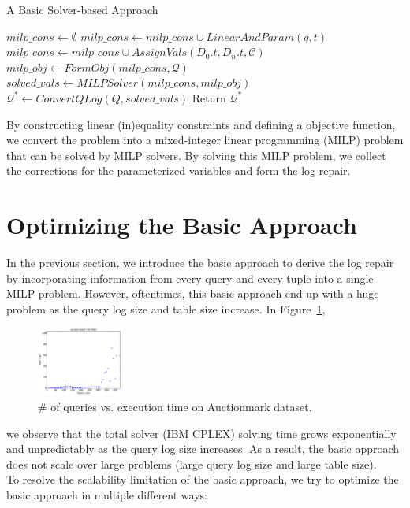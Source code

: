 \begin{algorithm}[htbp]
\caption{A Basic Solver-based Approach}
\label{alg:basic}
\begin{algorithmic}
\STATE $milp\_cons \leftarrow \emptyset$
\STATE $milp\_cons \leftarrow milp\_cons \cup LinearAndParam(q, t)$
\ENDFOR
\STATE $milp\_cons \leftarrow milp\_cons \cup AssignVals(D_0.t, D_n.t, \mathcal{C})$
\ENDFOR 
\STATE $milp\_obj \leftarrow FormObj (milp\_cons, \mathcal{Q})$
\STATE $solved\_vals \leftarrow MILPSolver(milp\_cons, milp\_obj)$
\STATE $\mathcal{Q}^* \leftarrow ConvertQLog(Q, solved\_vals)$
\STATE Return $\mathcal{Q}^*$
\end{algorithmic}
\end{algorithm}
By constructing linear (in)equality constraints and
defining a objective function, we convert the problem into
 a mixed-integer linear programming (MILP) problem that can be 
 solved by MILP solvers. By solving this MILP problem, we collect the
corrections for the parameterized variables and form the log repair. 
\section{Optimizing the Basic Approach}
\label{sec:opt}
In the previous section, we introduce the basic approach to derive
the log repair by incorporating information from every query
and every tuple into a single MILP problem. However, oftentimes, 
this basic approach end up with 
a huge problem as the query log size and table size increase. 
In Figure~\ref{fig:querysize_vs_time}, 
\begin{figure}
    \centering
        \includegraphics[width=0.25\textwidth]{figures/auctionmark_qsize_time}
    \caption{\# of queries vs. execution time on Auctionmark dataset. }
    \label{fig:querysize_vs_time}
\end{figure}
we observe that the total solver (IBM CPLEX) solving time 
grows exponentially and 
unpredictably as the query 
log size increases. As a result, the basic approach does not scale over 
large problems (large query log size and large table size).\\
To resolve the scalability limitation of the basic approach, 
we try to optimize
the basic approach in multiple different ways:

